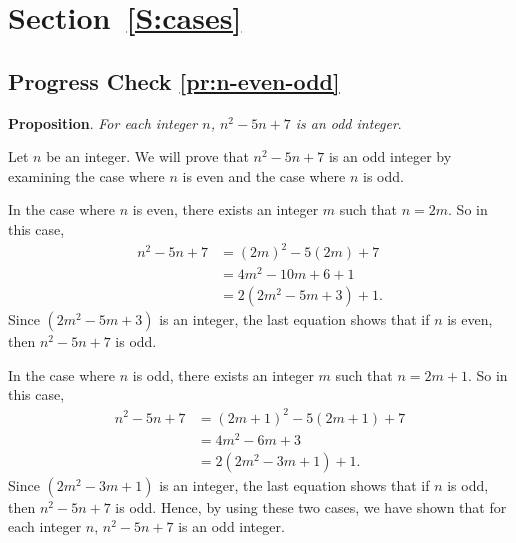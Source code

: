 \section*{Section~\ref{S:cases}}
\subsection*{Progress Check \ref{pr:n-even-odd}}
\textbf{Proposition}. \emph{For each integer $n$, $n^2 - 5n + 7$ is an odd integer}.

\begin{myproof}
Let $n$ be an integer.  We will prove that $n^2 - 5n + 7$ is an odd integer by examining the case where $n$ is even and the case where $n$ is odd.

\noindent
In the case where $n$ is even, there exists an integer $m$ such that $n = 2m$.  So in this case,
\[
\begin{aligned}
n^2 - 5n + 7 &= \left( 2m \right)^2 - 5 \left( 2m \right) + 7 \\
             &= 4m^2 - 10m + 6 + 1 \\
             &= 2 \left(2m^2 - 5m + 3 \right) + 1.
\end{aligned}
\]
Since $\left( 2m^2 - 5m + 3 \right)$ is an integer, the last equation shows that if $n$ is even, then $n^2 - 5n + 7$ is odd.

In the case where $n$ is odd, there exists an integer $m$ such that $n = 2m +1$.  So in this case,
\[
\begin{aligned}
n^2 - 5n + 7 &= \left( 2m + 1 \right)^2 - 5 \left( 2m + 1 \right) + 7 \\
             &= 4m^2 - 6m + 3 \\
             &= 2 \left(2m^2 - 3m + 1 \right) + 1.
\end{aligned}
\]
Since $\left( 2m^2 - 3m + 1 \right)$ is an integer, the last equation shows that if $n$ is odd, then $n^2 - 5n + 7$ is odd.  Hence, by using these two cases, we have shown that for each integer $n$, $n^2 - 5n + 7$ is an odd integer.
\end{myproof}



%
%




